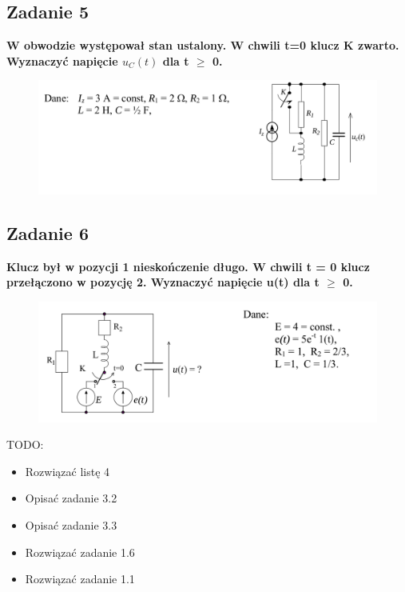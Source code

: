 \documentclass[12pt, a4paper]{article}
\begin{document}
\subsection{Zadanie 5}
\textbf{W obwodzie występował stan ustalony. W chwili t=0 klucz K zwarto. Wyznaczyć
  napięcie $u_C(t)$ dla t $\geq$ 0.}
\begin{figure}[H]
  \centering
  \includegraphics[width = \textwidth]{./images/Lista_4/Zadanie_5.png}
\end{figure}

\subsection{Zadanie 6}
\textbf{Klucz był w pozycji 1 nieskończenie długo. W chwili t = 0 klucz przełączono w
  pozycję 2. Wyznaczyć napięcie u(t) dla t $\geq$ 0.}
\begin{figure}[H]
  \centering
  \includegraphics[width = \textwidth]{./images/Lista_4/Zadanie_6.png}
\end{figure}

\newpage
\Large{TODO:}
\begin{itemize}
  \item Rozwiązać listę 4
  \item Opisać zadanie 3.2
  \item Opisać zadanie 3.3
  \item Rozwiązać zadanie 1.6
  \item Rozwiązać zadanie 1.1
\end{itemize}
\end{document}
